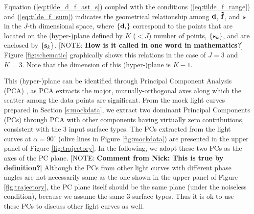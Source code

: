 \documentclass[iop,numberedappendix,apj,]{emulateapj}
\def\fast{\tilde f}
\def\memoYF#1{\color{red}[NOTE: {\bf #1}]\color{black}}
\begin{document}

Equation (\ref{eq:tilde_d_f_ast_s}) coupled with the conditions (\ref{eq:tilde_f_range}) and (\ref{eq:tilde_f_sum}) indicates the geometrical relationship among ${\bf d}$, ${\bf \fast }$, and ${\bf s}$ in the $J$-th dimensional space, where $\{{\bf d}_i\}$ correspond to the points that are located on the (hyper-)plane defined by $K$ ($<J$) number of points, $\{{\bf s}_k\} $, and are enclosed by $\{{\bf s}_k \}$. \memoYF{How is it called in one word in mathematics?}
Figure \ref{fig:schematic} graphically shows this relations in the case of $J=3$ and $K=3$. 
Note that the dimension of this (hyper-)plane is $K-1$.  

This (hyper-)plane can be identified through Principal Component Analysis (PCA) \citep{Cowan2009,Cowan2011}, as PCA extracts the major, mutually-orthogonal axes along which the scatter among the data points are significant. 
From the mock light curves prepared in Section \ref{s:mockdata}, we extract two dominant Principal Components (PCs) through PCA with other components having virtually zero contributions, consistent with the 3 input surface types.  
The PCs extracted from the light curves at $\alpha = 90^{\circ }$ (olive lines in Figure \ref{fig:mockdata}) are presented in the upper panel of Figure \ref{fig:trajectory}. 
In the following, we adopt these two PCs as the axes of the PC plane. \memoYF{Comment from Nick: This is true by definition?}
Although the PCs from other light curves with different phase angles are not necessarily same as the one shown in the upper panel of Figure \ref{fig:trajectory}, the PC plane itself should be the same plane (under the noiseless condition), because we assume the same 3 surface types. Thus it is ok to use these PCs to discuss other light curves as well. 
\end{document}
